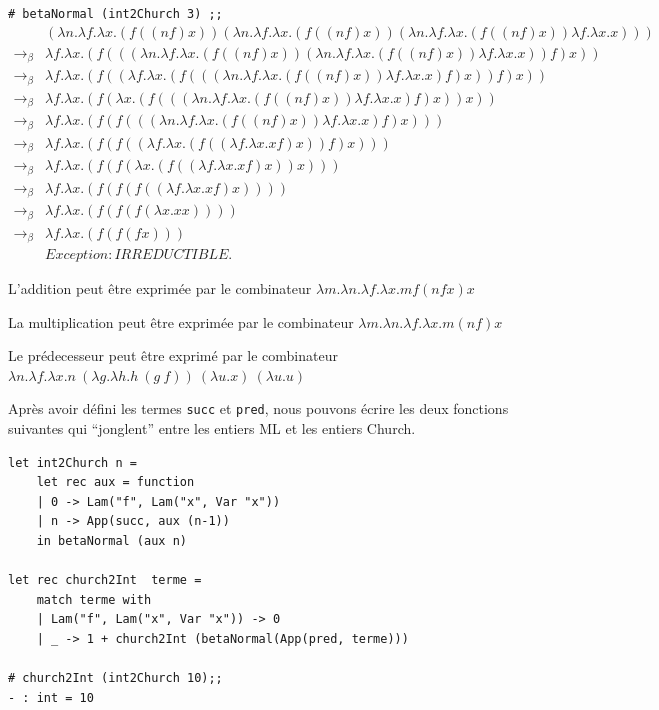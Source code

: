 \verb+# betaNormal (int2Church 3) ;;+
$$
\begin{array}{ll}
 & (\lambda n . \lambda f . \lambda x . (f((nf)x))(\lambda n . \lambda f . \lambda x . (f((nf)x))(\lambda n . \lambda f . \lambda x . (f((nf)x))\lambda f . \lambda x . x)))   \\
\rightarrow _\beta & \lambda f . \lambda x . (f(((\lambda n . \lambda f . \lambda x . (f((nf)x))(\lambda n . \lambda f . \lambda x . (f((nf)x))\lambda f . \lambda x . x))f)x))   \\
\rightarrow _\beta & \lambda f . \lambda x . (f((\lambda f . \lambda x . (f(((\lambda n . \lambda f . \lambda x . (f((nf)x))\lambda f . \lambda x . x)f)x))f)x))   \\
\rightarrow _\beta & \lambda f . \lambda x . (f(\lambda x . (f(((\lambda n . \lambda f . \lambda x . (f((nf)x))\lambda f . \lambda x . x)f)x))x))   \\
\rightarrow _\beta & \lambda f . \lambda x . (f(f(((\lambda n . \lambda f . \lambda x . (f((nf)x))\lambda f . \lambda x . x)f)x)))   \\
\rightarrow _\beta & \lambda f . \lambda x . (f(f((\lambda f . \lambda x . (f((\lambda f . \lambda x . xf)x))f)x)))   \\
\rightarrow _\beta & \lambda f . \lambda x . (f(f(\lambda x . (f((\lambda f . \lambda x . xf)x))x)))   \\
\rightarrow _\beta & \lambda f . \lambda x . (f(f(f((\lambda f . \lambda x . xf)x))))   \\
\rightarrow _\beta & \lambda f . \lambda x . (f(f(f(\lambda x . xx))))   \\
\rightarrow _\beta & \lambda f . \lambda x . (f(f(fx)))   \\
& Exception: IRREDUCTIBLE. 
\end{array}
$$

L'addition peut être  exprimée par le combinateur $\lambda m .\lambda n .\lambda f. \lambda x. m f (n f x) x$ 


La multiplication peut être exprimée par le combinateur $\lambda m .\lambda n .\lambda f. \lambda x. m (n f) x $ 


Le prédecesseur peut être exprimé par le combinateur $\lambda n.\lambda f.\lambda x.n\ (\lambda g.\lambda h.h\ (g\ f))\ (\lambda u.x)\ (\lambda u.u) $ 


Après avoir défini les termes \verb+succ+ et \verb+pred+, nous pouvons écrire les deux fonctions suivantes qui ``jonglent''
entre les entiers ML et les entiers Church.
\begin{Verbatim}
let int2Church n = 
	let rec aux = function
	| 0 -> Lam("f", Lam("x", Var "x"))
	| n -> App(succ, aux (n-1))
	in betaNormal (aux n)

let rec church2Int  terme = 
	match terme with
	| Lam("f", Lam("x", Var "x")) -> 0
	| _ -> 1 + church2Int (betaNormal(App(pred, terme)))

# church2Int (int2Church 10);;
- : int = 10
\end{Verbatim}


